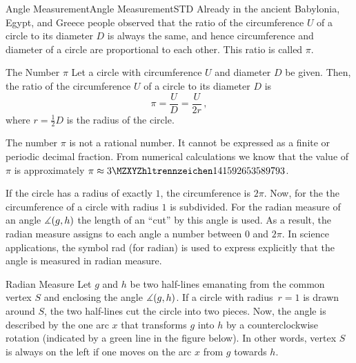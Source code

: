 \begin{MXContent}{Angle Measurement}{Angle Measurement}{STD}
Already in the ancient Babylonia, Egypt, and Greece people observed that
the ratio of the circumference $U$ of a circle to its diameter $D$ is always 
the same, and hence circumference and diameter of a circle are proportional to 
each other. This ratio is called $\pi$.


\begin{MXInfo}{The Number $\pi$}%
Let a circle with circumference $U$ and diameter $D$ be given. 
Then, the ratio of the circumference $U$ of a circle to its diameter $D$
is
\[
\pi = \frac{U}{D} = \frac{U}{2r}\, ,%
\]
where $r = \frac{1}{2} D$ is the radius of the circle.

The number $\pi$ is not a rational number. It cannot be expressed as a 
finite or periodic decimal fraction. From numerical calculations we know that
the value of $\pi$ is approximately $\pi \approx \MZahl{3}{141592653589793}$.
\end{MXInfo}

If the circle has a radius of exactly $1$, the circumference is $2\pi$. Now, for the 
 the circumference of a circle with radius $1$ is subdivided. 
For the radian measure of an angle $\measuredangle(g,h)$ the length of an  
``cut'' by this angle is used. As a result, the radian measure assigns to each angle a number 
between $0$ and $2\pi$. In science applications, the symbol rad (for radian) is used to
express explicitly that the angle is measured in radian measure.

\begin{MXInfo}{Radian Measure}%
Let $g$ and $h$ be two half-lines emanating from the common vertex $S$ and enclosing 
the angle $\measuredangle(g,h)$. If a circle with radius~$r = 1$ is drawn around $S$, the
two half-lines cut the circle into two pieces. Now, the angle is described by the one arc $x$ 
that transforms $g$ into $h$ by a counterclockwise rotation (indicated by a green line in the 
figure below). In other words, vertex $S$ is always on the left if one moves on the 
arc $x$ from $g$ towards $h$.

\begin{center}
\end{center}


\end{MXInfo}
\end{MXContent}
